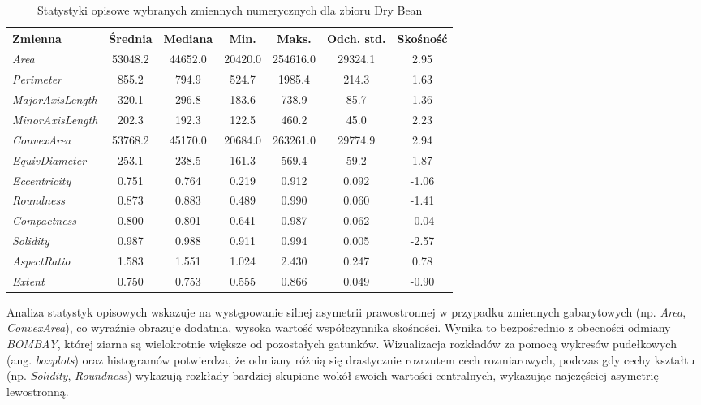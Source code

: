 \documentclass{report}
\begin{document}
\begin{table}[H]
\centering
\caption{Statystyki opisowe wybranych zmiennych numerycznych dla zbioru Dry Bean}
\label{tab:statystyki_opisowe}
\begin{tabular}{lcccccc}
\toprule
\textbf{Zmienna} & \textbf{Średnia} & \textbf{Mediana} & \textbf{Min.} & \textbf{Maks.} & \textbf{Odch. std.} & \textbf{Skośność} \\
\midrule
\textit{Area} & 53048.2 & 44652.0 & 20420.0 & 254616.0 & 29324.1 & 2.95 \\
\textit{Perimeter} & 855.2 & 794.9 & 524.7 & 1985.4 & 214.3 & 1.63 \\
\textit{MajorAxisLength} & 320.1 & 296.8 & 183.6 & 738.9 & 85.7 & 1.36 \\
\textit{MinorAxisLength} & 202.3 & 192.3 & 122.5 & 460.2 & 45.0 & 2.23 \\
\textit{ConvexArea} & 53768.2 & 45170.0 & 20684.0 & 263261.0 & 29774.9 & 2.94 \\
\textit{EquivDiameter} & 253.1 & 238.5 & 161.3 & 569.4 & 59.2 & 1.87 \\
\textit{Eccentricity} & 0.751 & 0.764 & 0.219 & 0.912 & 0.092 & -1.06 \\
\textit{Roundness} & 0.873 & 0.883 & 0.489 & 0.990 & 0.060 & -1.41 \\
\textit{Compactness} & 0.800 & 0.801 & 0.641 & 0.987 & 0.062 & -0.04 \\
\textit{Solidity} & 0.987 & 0.988 & 0.911 & 0.994 & 0.005 & -2.57 \\
\textit{AspectRatio} & 1.583 & 1.551 & 1.024 & 2.430 & 0.247 & 0.78 \\
\textit{Extent} & 0.750 & 0.753 & 0.555 & 0.866 & 0.049 & -0.90 \\
\bottomrule
\end{tabular}
\end{table}

Analiza statystyk opisowych wskazuje na występowanie silnej asymetrii prawostronnej w przypadku zmiennych gabarytowych (np. \textit{Area}, \textit{ConvexArea}), co wyraźnie obrazuje dodatnia, wysoka wartość współczynnika skośności. Wynika to bezpośrednio z obecności odmiany \textit{BOMBAY}, której ziarna są wielokrotnie większe od pozostałych gatunków. Wizualizacja rozkładów za pomocą wykresów pudełkowych (ang. \textit{boxplots}) oraz histogramów potwierdza, że odmiany różnią się drastycznie rozrzutem cech rozmiarowych, podczas gdy cechy kształtu (np. \textit{Solidity}, \textit{Roundness}) wykazują rozkłady bardziej skupione wokół swoich wartości centralnych, wykazując najczęściej asymetrię lewostronną.
\end{document}
